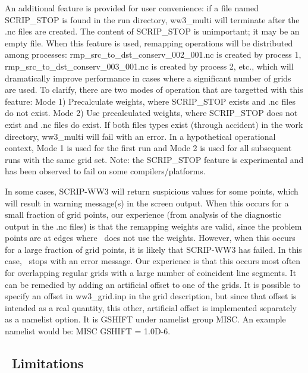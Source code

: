 An additional feature is provided for user convenience: if a file named {\file
  SCRIP\_STOP} is found in the run directory, {\file ww3\_multi} will
terminate after the {\file .nc} files are created. The content of {\file
  SCRIP\_STOP} is unimportant; it may be an empty file. When this feature is
used, remapping operations will be distributed among processes: {\file
  rmp\_src\_to\_dst\_conserv\_002\_001.nc} is created by process 1, {\file
  rmp\_src\_to\_dst\_conserv\_003\_001.nc} is created by process 2, etc.,
which will dramatically improve performance in cases where a significant
number of grids are used. To clarify, there are two modes of operation that are
 targetted with this feature: Mode 1) Precalculate weights, where 
{\file SCRIP\_STOP} exists and  {\file .nc} files do not exist. Mode 2) Use 
precalculated weights, where {\file SCRIP\_STOP} does not exist and {\file .nc}
 files do exist. If both files types exist (through accident) in the work 
directory, {\file ww3\_multi} will fail with an error. In a hypothetical 
operational context, Mode 1 is used for the first run and Mode 2 is used for 
all subsequent runs with the same grid set.  Note: the {\file SCRIP\_STOP} 
feature is experimental and has been observed to fail on some 
compilers/platforms. 

In some cases, SCRIP-WW3 will return suspicious values for some points, which
will result in warning message(s) in the screen output. When this occurs for a
small fraction of grid points, our experience (from analysis of the diagnostic
output in the {\file .nc} files) is that the remapping weights are valid,
since the problem points are at edges where \ws\ does not use the
weights. However, when this occurs for a large fraction of grid points, it is
likely that SCRIP-WW3 has failed. In this case, \ws\ stops with an error
message. Our experience is that this occurs most often for overlapping regular
grids with a large number of coincident line segments. It can be remedied by
adding an artificial offset to one of the grids. It is possible to specify an
offset in {\file ww3\_grid.inp} in the grid description, but since that offset
is intended as a real quantity, this other, artificial offset is implemented
separately as a namelist option. It is {\code GSHIFT} under namelist group
{\code MISC}. An example namelist would be: {\code MISC GSHIFT = 1.0D-6}.

\vssub
\subsection{~Limitations} \label{sec:scripE}
\vssub

